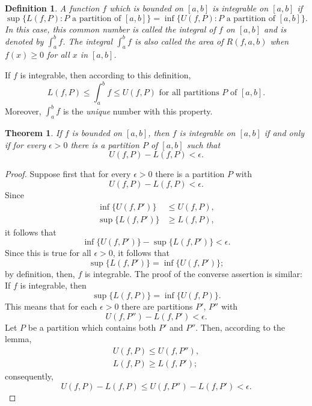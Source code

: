 \documentclass{article}
\numberwithin{corollary}{subsection}
\newtheorem{definition}{Definition}
\numberwithin{definition}{subsection}
\numberwithin{lemma}{subsection}
\newtheorem{theorem}{Theorem}
\numberwithin{theorem}{subsection}
\begin{document}
\begin{definition}
  A function $f$ which is bounded on $[a, b]$ is \emph{integrable} on $[a, b]$
  if \[
    \sup\{L(f, P): P \text{ a partition of } [a, b]\}
    = \inf\{U(f, P): P \text{ a partition of } [a, b]\}.
  \] In this case, this common number is called the \emph{integral} of $f$ on
  $[a, b]$ and is denoted by $\int_a^b f$. The integral $\int_a^b f$ is also
  called the \emph{area} of $R(f, a, b)$ when $f(x) \geq 0$ for all $x$ in
  $[a, b]$.
\end{definition}

If $f$ is integrable, then according to this definition, \[
  L(f, P) \leq \int_a^b f \leq U(f, P)
  \text{ for all partitions } P \text{ of } [a, b].
\] Moreover, $\int_a^b f$ is the \emph{unique} number with this property.

\begin{theorem}
  If $f$ is bounded on $[a, b]$, then $f$ is integrable on $[a, b]$ if and only
  if for every $\epsilon > 0$ there is a partition $P$ of $[a, b]$ such that \[
    U(f, P) - L(f, P) < \epsilon.
  \]
\end{theorem}
\begin{proof}
  Suppose first that for every $\epsilon > 0$ there is a partition $P$ with \[
    U(f, P) - L(f, P) < \epsilon.
  \] Since
  \begin{align*}
    \inf\{U(f, P')\} &\leq U(f, P), \\
    \sup\{L(f, P')\} &\geq L(f, P),
  \end{align*}
  it follows that \[
    \inf\{U(f, P')\} - \sup\{L(f, P')\} < \epsilon.
  \] Since this is true for all $\epsilon > 0$, it follows that \[
    \sup\{L(f, P')\} = \inf\{U(f, P')\};
  \] by definition, then, $f$ is integrable. The proof of the converse
  assertion is similar: If $f$ is integrable, then \[
    \sup\{L(f, P)\} = \inf\{U(f, P)\}.
  \] This means that for each $\epsilon > 0$ there are partitions $P'$, $P''$
  with \[
    U(f, P'') - L(f, P') < \epsilon.
  \] Let $P$ be a partition which contains both $P'$ and $P''$. Then, according
  to the lemma,
  \begin{align*}
    U(f, P) \leq U(f, P''), \\
    L(f, P) \geq L(f, P');
  \end{align*}
  consequently, \[
    U(f, P) - L(f, P) \leq U(f, P'') - L(f, P') < \epsilon.
  \]
\end{proof}
\end{document}
